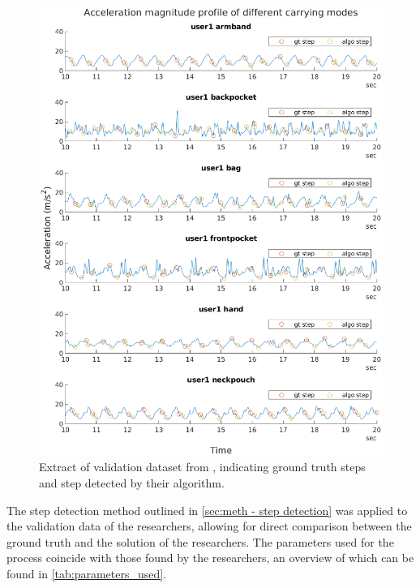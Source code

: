 \begin{figure}
	\centering
	\includegraphics[width=\linewidth]{images/20200929_0951_gt_steps_vs_salvi_steps}
	\caption[Step detection validation data]{Extract of validation dataset from \citet{Salvi2018}, indicating ground truth steps and step detected by their algorithm.}
	\label{fig:gt_steps_vs_salvi_steps}
\end{figure}


The step detection method outlined in \cref{sec:meth - step detection} was applied to the validation data of the researchers, allowing for direct comparison between the ground truth and the solution of the researchers. The parameters used for the process coincide with those found by the researchers, an overview of which can be found in \cref{tab:parameters_used}.

